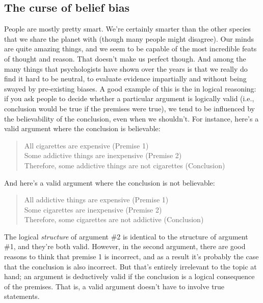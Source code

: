 \subsection{The curse of belief bias}

People are mostly pretty smart. We're certainly smarter than the other species that we share the planet with (though many people might disagree). Our minds are quite amazing things, and we seem to be capable of the most incredible feats of thought and reason. That doesn't make us perfect though. And among the many things that psychologists have shown over the years is that we really do find it hard to be neutral, to evaluate evidence impartially and without being swayed by pre-existing biases. A good example of this is the  in logical reasoning: if you ask people to decide whether a particular argument is logically valid (i.e., conclusion would be true if the premises were true), we tend to be influenced by the believability of the conclusion, even when we shouldn't. For instance, here's a valid argument where the conclusion is believable:
\begin{quote}
All cigarettes are expensive (Premise 1) \\
Some addictive things are inexpensive (Premise 2)\\
Therefore, some addictive things are not cigarettes (Conclusion)
\end{quote}
And here's a valid argument where the conclusion is not believable:
\begin{quote}
All addictive things are expensive (Premise 1)\\
Some cigarettes are inexpensive (Premise 2)\\
Therefore, some cigarettes are not addictive (Conclusion)
\end{quote}
The logical {\it structure} of argument \#2 is identical to the structure of argument \#1, and they're both valid. However, in the second argument, there are good reasons to think that premise 1 is incorrect, and as a result it's probably the case that the conclusion is also incorrect. But that's entirely irrelevant to the topic at hand; an argument is deductively valid if the conclusion is a logical consequence of the premises. That is, a valid argument doesn't have to involve true statements.

